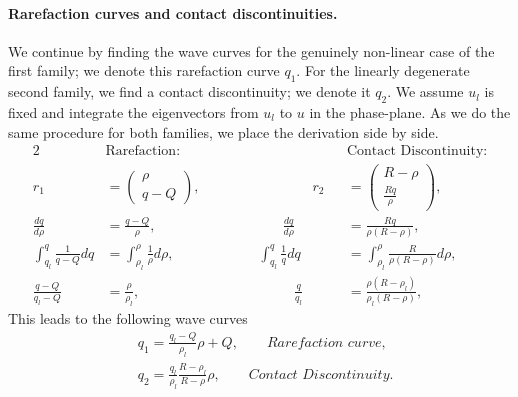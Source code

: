 \documentclass[10pt]{article}
\numberwithin{equation}{section}
\begin{document}
\paragraph{Rarefaction curves and contact discontinuities.}
We continue by finding the wave curves for the genuinely non-linear case of the first family; we denote this rarefaction curve $q_1$. For the linearly degenerate second family, we find a contact discontinuity; we denote it $q_2$. We assume $u_l$ is fixed and integrate the eigenvectors from $u_l$ to $u$ in the phase-plane. As we do the same procedure for both families, we place the derivation side by side.  
\begin{alignat*}{2}
    & \text{Rarefaction:}  && \text{Contact Discontinuity:} \\
    r_1 &= \begin{pmatrix} \rho \\ q - Q \end{pmatrix}, \quad\quad \quad\quad\quad \quad\quad\quad   r_2 &&= \begin{pmatrix} R - \rho \\ \frac{Rq}{\rho} \end{pmatrix}, \\ 
    \frac{dq}{d\rho} &= \frac{q-Q}{\rho}, \quad\quad \quad\quad\quad\quad\quad\quad\quad  \frac{dq}{d\rho} &&= \frac{Rq}{\rho(R-\rho)},  \\
    \int_{q_l}^{q} \frac{1}{q-Q} dq &= \int_{\rho_l}^{\rho} \frac{1}{\rho} d\rho, \quad\quad\quad \quad\quad\quad \int_{q_l}^{q} \frac{1}{q} dq &&= \int_{\rho_l}^{\rho} \frac{R}{\rho(R - \rho)} d\rho, \\
    \frac{q-Q}{q_l -Q} &= \frac{\rho}{\rho_l}, \quad \quad\quad\quad\quad\quad\quad\quad\quad\quad\quad  \frac{q}{q_l} &&= \frac{\rho( R- \rho_l)}{\rho_l(R-\rho)},
\end{alignat*}
This leads to the following wave curves
\begin{align}
    & q_1 = \frac{q_l - Q}{\rho_l} \rho + Q, \quad \quad \textit{Rarefaction curve,}
    \label{Eq:RarefactionWCongestedPh} \\
    &  q_2 = \frac{q_l}{\rho_l} \frac{R - \rho_l}{R- \rho} \rho,   \quad \quad \textit{Contact Discontinuity.}
    \label{Eq:ContactDiscCongestedPh}
\end{align}
\end{document}
